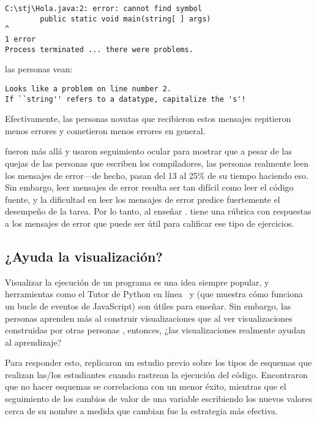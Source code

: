 \begin{verbatim}
C:\stj\Hola.java:2: error: cannot find symbol
        public static void main(string[ ] args)
^
1 error
Process terminated ... there were problems.
\end{verbatim}

\noindent
las personas vean:

\begin{verbatim}
Looks like a problem on line number 2.
If ``string'' refers to a datatype, capitalize the 's'!
\end{verbatim}

\noindent
Efectivamente,
las personas novatas que recibieron estos mensajes repitieron menos errores y cometieron menos errores en general.

\cite{Bari2017} fueron más allá y usaron seguimiento ocular para mostrar que
a pesar de las quejas de las personas que escriben los compiladores,
las personas realmente leen los mensajes de error---de hecho, pasan del 13 al 25\% de su tiempo haciendo eso.
Sin embargo,
leer mensajes de error resulta ser tan difícil como leer el código fuente,
y la dificultad en leer los mensajes de error predice fuertemente el desempeño de la tarea.
Por lo tanto, al enseñar
.
\cite{Marc2011} tiene una rúbrica con respuestas a los mensajes de error que puede ser útil para calificar ese tipo de ejercicios.

\subsection*{¿Ayuda la visualización?}

Visualizar la ejecución de un programa es una idea siempre popular,
y herramientas como el Tutor de Python en línea~\cite{Guo2013}
y 
(que muestra cómo funciona un bucle de eventos de JavaScript)
son útiles para enseñar.
Sin embargo,
las personas aprenden más al construir visualizaciones
que al ver visualizaciones construidas por otras personas \cite{Stas1998,Ceti2016},
entonces, ¿las visualizaciones realmente ayudan al aprendizaje?

Para responder esto,
\cite{Cunn2017} replicaron un estudio previo sobre los tipos de esquemas que realizan las/los estudiantes cuando rastrean la ejecución del código.
Encontraron que no hacer esquemas se correlaciona con un menor éxito,
mientras que el seguimiento de los cambios de valor de una variable escribiendo los nuevos valores cerca de su nombre
a medida que cambian fue la estrategia más efectiva.

